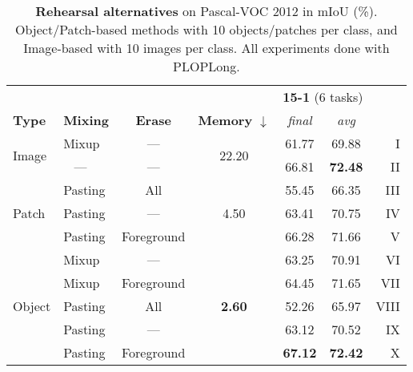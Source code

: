 \begin{table}[t]
    \centering
    \begin{tabular}{@{}llc|c|cc|r@{}}
        \toprule
                                &                 &                &                                & \multicolumn{2}{c}{\textbf{15-1} (6 tasks)}                         \\
        \textbf{Type}           & \textbf{Mixing} & \textbf{Erase} & \textbf{Memory} $\downarrow$   & \textit{final}                              & \textit{avg}   &      \\
        \midrule
        \multirow{2}{*}{Image}  & Mixup           & ---            & \multirow{2}{*}{22.20}         & 61.77                                       & 69.88          & I    \\
                                & \,\,\,\,\,---   & ---            &                                & 66.81                                       & \textbf{72.48} & II   \\
        \hline
        \multirow{3}{*}{Patch}  & Pasting         & All            & \multirow{3}{*}{4.50}          & 55.45                                       & 66.35          & III  \\
                                & Pasting         & ---            &                                & 63.41                                       & 70.75          & IV   \\
                                & Pasting         & Foreground     &                                & 66.28                                       & 71.66          & V    \\
        \hline
        \multirow{5}{*}{Object} & Mixup           & ---            & \multirow{5}{*}{\textbf{2.60}} & 63.25                                       & 70.91          & VI   \\
                                & Mixup           & Foreground     &                                & 64.45                                       & 71.65          & VII  \\
                                & Pasting         & All            &                                & 52.26                                       & 65.97          & VIII \\
                                & Pasting         & ---            &                                & 63.12                                       & 70.52          & IX   \\
                                & Pasting         & Foreground     &                                & \textbf{67.12}                              & \textbf{72.42} & X    \\
        \bottomrule
    \end{tabular}
    \caption{\textbf{Rehearsal alternatives} on Pascal-VOC 2012 in \ac{mIoU} (\%). Object/Patch-based methods
        with 10 objects/patches per class, and Image-based with 10 images per class. All
        experiments done with PLOPLong.}
    \label{tab:seg_rehearsal_alternative}
\end{table}
